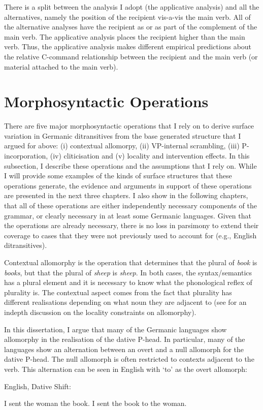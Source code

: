 There is a split between the analysis I adopt (the applicative analysis) and all the alternatives, namely the position of the recipient vis-a-vis the main verb. All of the alternative analyses have the recipient as or as part of the complement of the main verb. The applicative analysis places the recipient higher than the main verb. Thus, the applicative analysis makes different empirical predictions about the relative C-command relationship between the recipient and the main verb (or material attached to the main verb).

\section{Morphosyntactic Operations}
There are five major morphosyntactic operations that I rely on to derive surface variation in Germanic ditransitives from the base generated structure that I argued for above: (i) contextual allomorpy, (ii) VP-internal scrambling, (iii) P-incorporation, (iv) cliticisation and (v) locality and intervention effects. In this subsection, I describe these operations and the assumptions that I rely on. While I will provide some examples of the kinds of surface structures that these operations generate, the evidence and arguments in support of these operations are presented in the next three chapters. I also show in the following chapters, that all of these operations are either independently necessary components of the grammar, or clearly necessary in at least some Germanic languages. Given that the operations are already necessary, there is no loss in parsimony to extend their coverage to cases that they were not previously used to account for (e.g., English ditransitives).

Contextual allomorphy is the operation that determines that the plural of \textit{book} is \textit{books}, but that the plural of \textit{sheep} is \textit{sheep}. In both cases, the syntax/semantics has a plural element and it is necessary to know what the phonological reflex of plurality is. The contextual aspect comes from the fact that plurality has different realisations depending on what noun they are adjacent to (see \citealt{Embick.2010} for an indepth discussion on the locality constraints on allomorphy). 

In this dissertation, I argue that many of the Germanic languages show allomorphy in the realisation of the dative P-head. In particular, many of the languages show an alternation between an overt and a null allomorph for the dative P-head. The null allomorph is often restricted to contexts adjacent to the verb. This alternation can be seen in English with `to' as the overt allomorph:
\begin{exe}
	\ex English, Dative Shift: \label{ex:dat-shift}
	\begin{xlist}
		\ex \label{ex:english-1} I sent the woman the book.
		\ex \label{ex:english-2} I sent the book to the woman.
	\end{xlist}
\end{exe}

